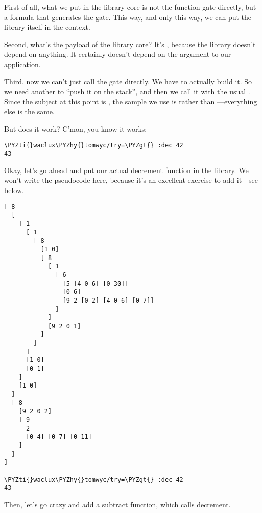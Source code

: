 First of all, what we put in the library core is not the function
gate directly, but a formula that generates the gate.  This way,
and only this way, we can put the library itself in the context.

Second, what's the payload of the library core?  It's ,
because the library doesn't depend on anything.  It certainly
doesn't depend on the argument to our application.

Third, now we can't just call the gate directly.  We have to
actually build it.  So we need another  to ``push it on the
stack'', and then we call it with the usual .  Since the
subject at this point is , the sample we
use is \kode{[0 7]} rather than \kode{[0 3]}---everything else is the same.

But does it work?  C'mon, you know it works:

\begin{framed_shaded}
\begin{Verbatim}[fontsize=\relsize{-2.5},fontseries=b,commandchars=\\\{\}]
\PYZti{}waclux\PYZhy{}tomwyc/try=\PYZgt{} :dec 42
43
\end{Verbatim}
\end{framed_shaded}
Okay, let's go ahead and put our actual decrement function in
the library.  We won't write the pseudocode here, because it's an
excellent exercise to add it---see below.

\begin{framed_shaded}
\begin{Verbatim}[fontsize=\relsize{-2.5},fontseries=b,commandchars=\\\{\}]
[ 8
  [
    [ 1
      [ 1
        [ 8
          [1 0]
          [ 8
            [ 1
              [ 6
                [5 [4 0 6] [0 30]]
                [0 6]
                [9 2 [0 2] [4 0 6] [0 7]]
              ]
            ]
            [9 2 0 1]
          ]
        ]
      ]
      [1 0]
      [0 1]
    ]
    [1 0]
  ]
  [ 8
    [9 2 0 2]
    [ 9
      2
      [0 4] [0 7] [0 11]
    ]
  ]
]

\PYZti{}waclux\PYZhy{}tomwyc/try=\PYZgt{} :dec 42
43
\end{Verbatim}
\end{framed_shaded}
Then, let's go crazy and add a subtract function, which calls
decrement.


